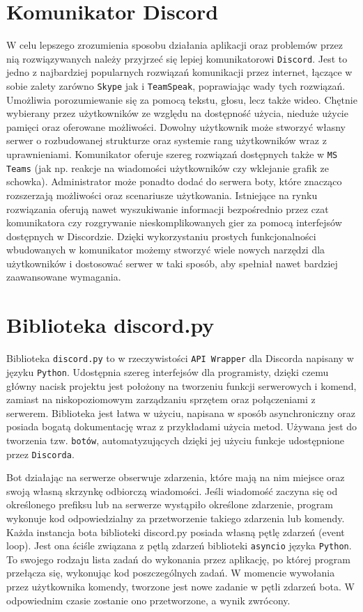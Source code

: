 \documentclass[shortabstract,inz]{iithesis}
\begin{document}
		\section{Komunikator Discord}
			W celu lepszego zrozumienia sposobu działania aplikacji oraz problemów przez nią rozwiązywanych należy przyjrzeć się lepiej komunikatorowi \texttt{Discord}. Jest to jedno z najbardziej popularnych rozwiązań komunikacji przez internet, łączące w sobie zalety zarówno \texttt{Skype}\cite{skype} jak i \texttt{TeamSpeak}\cite{teamspeak}, poprawiając wady tych rozwiązań. Umożliwia porozumiewanie się za pomocą tekstu, głosu, lecz także wideo. Chętnie wybierany przez użytkowników ze względu na dostępność użycia, nieduże użycie pamięci oraz oferowane możliwości. Dowolny użytkownik może stworzyć własny serwer o rozbudowanej strukturze oraz systemie rang użytkowników wraz z uprawnieniami. Komunikator oferuje szereg rozwiązań dostępnych także w \texttt{MS Teams}\cite{msteams} (jak np. reakcje na wiadomości użytkowników czy wklejanie grafik ze schowka). Administrator może ponadto dodać do serwera boty, które znacząco rozszerzają możliwości oraz scenariusze użytkowania. Istniejące na rynku rozwiązania oferują nawet wyszukiwanie informacji bezpośrednio przez czat komunikatora czy rozgrywanie nieskomplikowanych gier za pomocą interfejsów dostępnych w Discordzie. Dzięki wykorzystaniu prostych funkcjonalności wbudowanych w komunikator możemy stworzyć wiele nowych narzędzi dla użytkowników i dostosować serwer w taki sposób, aby spełniał nawet bardziej zaawansowane wymagania.
		
		\section{Biblioteka discord.py}
			Biblioteka \texttt{discord.py} to w rzeczywistości \texttt{API Wrapper} dla Discorda napisany w języku \texttt{Python}. Udostępnia szereg interfejsów dla programisty, dzięki czemu główny nacisk projektu jest położony na tworzeniu funkcji serwerowych i komend, zamiast na niskopoziomowym zarządzaniu sprzętem oraz połączeniami z serwerem. Biblioteka jest łatwa w użyciu, napisana w sposób asynchroniczny oraz posiada bogatą dokumentację\cite{discordpydocs} wraz z przykładami użycia metod\cite{discordpyexamples}. Używana jest do tworzenia tzw. \texttt{botów}, automatyzujących dzięki jej użyciu funkcje udostępnione przez \texttt{Discorda}. 

			Bot działając na serwerze obserwuje zdarzenia, które mają na nim miejsce oraz swoją własną skrzynkę odbiorczą wiadomości. Jeśli wiadomość zaczyna się od określonego prefiksu lub na serwerze wystąpiło określone zdarzenie, program wykonuje kod odpowiedzialny za przetworzenie takiego zdarzenia lub komendy. 
			Każda instancja bota biblioteki discord.py posiada własną pętlę zdarzeń (event loop). Jest ona ściśle związana z pętlą zdarzeń biblioteki \texttt{asyncio} języka \texttt{Python}. To swojego rodzaju lista zadań do wykonania przez aplikację, po której program przełącza się, wykonując kod poszczególnych zadań. W momencie wywołania przez użytkownika komendy, tworzone jest nowe zadanie w pętli zdarzeń bota. W odpowiednim czasie zostanie ono przetworzone, a wynik zwrócony.
			
\end{document}
